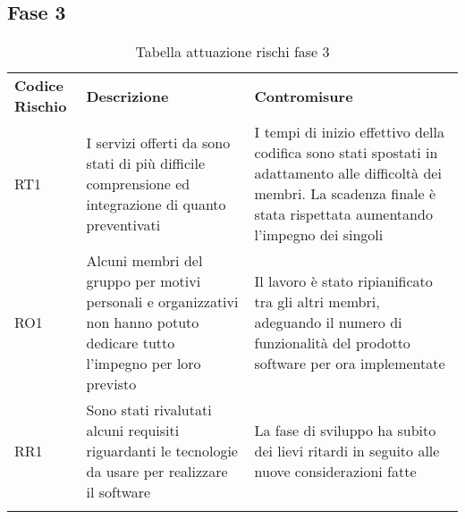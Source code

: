 \subsection{Fase 3}
\label{sec:fase_3}
\begin{center}
\renewcommand{\arraystretch}{1.5}
	\begin{longtable}[H]{  	>{\Centering}p{2cm}	
							>{\RaggedRight}p{6cm}	
							>{\RaggedRight}p{6cm}  
							}
							
		\rowcolor{tableHeadYellow}
		\textbf{Codice Rischio}   & \textbf{Descrizione} & \textbf{Contromisure}\\ 
		RT1	&	I servizi offerti da \markg{AWS} sono stati di più difficile comprensione ed integrazione di quanto preventivati & I tempi di inizio effettivo della codifica sono stati spostati in adattamento alle difficoltà dei membri. La scadenza finale è stata rispettata aumentando l'impegno dei singoli\\
		RO1	&	Alcuni membri del gruppo per motivi personali e organizzativi non hanno potuto dedicare tutto l'impegno per loro previsto & Il lavoro è stato ripianificato tra gli altri membri, adeguando il numero di funzionalità del prodotto software per ora implementate\\
		RR1	&	Sono stati rivalutati alcuni requisiti riguardanti le tecnologie da usare per realizzare il software & La fase di sviluppo ha subito dei lievi ritardi in seguito alle nuove considerazioni fatte\\
		
		\rowcolor{white}
		\caption{Tabella attuazione rischi fase 3}
	\end{longtable}
\end{center}
